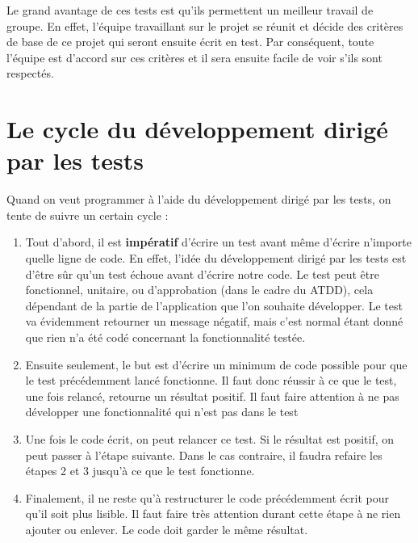 \documentclass[a4paper,10pt,french]{sphinxmanual}
\begin{document}
Le grand avantage de ces tests est qu'ils permettent un meilleur travail de
groupe. En effet, l'équipe travaillant sur le projet se réunit et décide des
critères de base de ce projet qui seront ensuite écrit en test. Par conséquent,
toute l'équipe est d'accord sur ces critères et il sera ensuite facile de voir
s'ils sont respectés.


\section{Le cycle du développement dirigé par les tests}
\label{tdd:le-cycle-du-developpement-dirige-par-les-tests}
Quand on veut programmer à l'aide du développement dirigé par les tests, on
tente de suivre un certain cycle \footnotemark[1]:
\begin{enumerate}
\item {} 
Tout d'abord, il est \textbf{impératif} d'écrire un test avant même d'écrire
n'importe quelle ligne de code. En effet, l'idée du développement dirigé par
les tests est d'être sûr qu'un test échoue avant d'écrire notre code. Le
test peut être fonctionnel, unitaire, ou d'approbation (dans le cadre du
ATDD), cela dépendant de la partie de l'application que l'on souhaite
développer. Le test va évidemment retourner un message négatif, mais c'est
normal étant donné que rien n'a été codé concernant la fonctionnalité
testée.

\item {} 
Ensuite seulement, le but est d'écrire un minimum de code possible
pour que le test précédemment lancé fonctionne. Il faut donc réussir
à ce que le test, une fois relancé, retourne un résultat positif. Il faut
faire attention à ne pas développer une fonctionnalité qui n'est pas dans
le test

\item {} 
Une fois le code écrit, on peut relancer ce test. Si le résultat
est positif, on peut passer à l'étape suivante. Dans le cas contraire,
il faudra refaire les étapes 2 et 3 jusqu'à ce que le test fonctionne.

\item {} 
Finalement, il ne reste qu'à restructurer le code précédemment écrit pour
qu'il soit plus lisible. Il faut faire très attention durant cette étape à
ne rien ajouter ou enlever. Le code doit garder le même résultat.

\end{enumerate}
\end{document}
